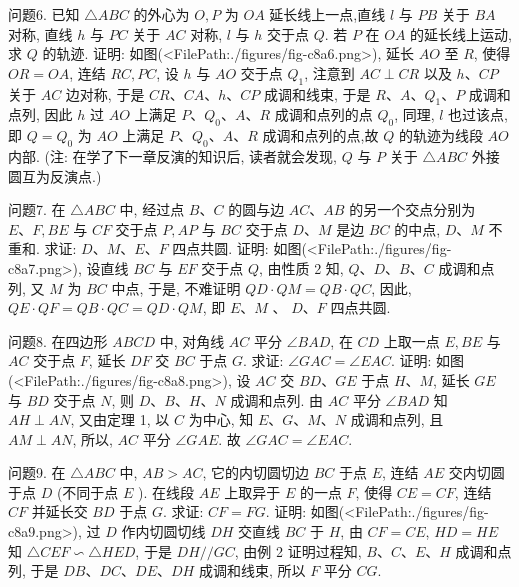 问题6. 已知 $\triangle A B C$ 的外心为 $O, P$ 为 $O A$ 延长线上一点,直线 $l$ 与 $P B$ 关于 $B A$ 对称, 直线 $h$ 与 $P C$ 关于 $A C$ 对称, $l$ 与 $h$ 交于点 $Q$. 若 $P$ 在 $O A$ 的延长线上运动,求 $Q$ 的轨迹.
证明: 如图(<FilePath:./figures/fig-c8a6.png>), 延长 $A O$ 至 $R$, 使得 $O R=O A$, 连结 $R C, P C$, 设 $h$ 与 $A O$ 交于点 $Q_1$, 注意到 $A C \perp C R$ 以及 $h 、 C P$ 关于 $A C$ 边对称, 于是 $C R 、 C A 、 h 、 C P$ 成调和线束, 于是 $R 、 A 、 Q_1 、 P$ 成调和点列, 因此 $h$ 过 $A O$ 上满足 $P 、 Q_0 、 A 、 R$ 成调和点列的点 $Q_0$, 同理, $l$ 也过该点, 即 $Q=Q_0$ 为 $A O$ 上满足 $P 、 Q_0 、 A 、 R$ 成调和点列的点,故 $Q$ 的轨迹为线段 $A O$ 内部.
(注: 在学了下一章反演的知识后, 读者就会发现, $Q$ 与 $P$ 关于 $\triangle A B C$ 外接圆互为反演点.)



问题7. 在 $\triangle A B C$ 中, 经过点 $B 、 C$ 的圆与边 $A C 、 A B$ 的另一个交点分别为 $E 、 F, B E$ 与 $C F$ 交于点 $P, A P$ 与 $B C$ 交于点 $D 、 M$ 是边 $B C$ 的中点, $D 、 M$ 不重和.
求证: $D 、 M 、 E 、 F$ 四点共圆.
证明: 如图(<FilePath:./figures/fig-c8a7.png>), 设直线 $B C$ 与 $E F$ 交于点 $Q$, 由性质 2 知, $Q 、 D 、 B 、 C$ 成调和点列, 又 $M$ 为 $B C$ 中点, 于是, 不难证明 $Q D \cdot Q M=Q B \cdot Q C$, 因此, $Q E \cdot Q F=Q B \cdot Q C=Q D \cdot Q M$, 即 $E 、 M$ 、 $D 、 F$ 四点共圆.



问题8. 在四边形 $A B C D$ 中, 对角线 $A C$ 平分 $\angle B A D$, 在 $C D$ 上取一点 $E, B E$ 与 $A C$ 交于点 $F$, 延长 $D F$ 交 $B C$ 于点 $G$. 求证: $\angle G A C=\angle E A C$.
证明: 如图(<FilePath:./figures/fig-c8a8.png>), 设 $A C$ 交 $B D 、 G E$ 于点 $H 、 M$, 延长 $G E$ 与 $B D$ 交于点 $N$, 则 $D 、 B 、 H 、 N$ 成调和点列.
由 $A C$ 平分 $\angle B A D$ 知 $A H \perp A N$, 又由定理 1, 以 $C$ 为中心, 知 $E 、 G 、 M 、 N$ 成调和点列, 且 $A M \perp A N$, 所以, $A C$ 平分 $\angle G A E$. 故 $\angle G A C=\angle E A C$.



问题9. 在 $\triangle A B C$ 中, $A B>A C$, 它的内切圆切边 $B C$ 于点 $E$, 连结 $A E$ 交内切圆于点 $D$ (不同于点 $E$ ). 在线段 $A E$ 上取异于 $E$ 的一点 $F$, 使得 $C E=C F$, 连结 $C F$ 并延长交 $B D$ 于点 $G$. 求证: $C F=F G$.
证明: 如图(<FilePath:./figures/fig-c8a9.png>), 过 $D$ 作内切圆切线 $D H$ 交直线 $B C$ 于 $H$, 由 $C F=C E$, $H D=H E$ 知 $\triangle C E F \backsim \triangle H E D$, 于是 $D H / / G C$, 由例 2 证明过程知, $B 、 C 、E 、 H$ 成调和点列, 于是 $D B 、 D C 、 D E 、 D H$ 成调和线束, 所以 $F$ 平分 $C G$.



